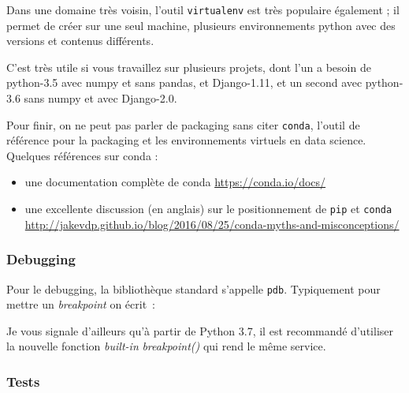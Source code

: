     Dans une domaine très voisin, l'outil \texttt{virtualenv} est très
populaire également ; il permet de créer sur une seul machine, plusieurs
environnements python avec des versions et contenus différents.

C'est très utile si vous travaillez sur plusieurs projets, dont l'un a
besoin de python-3.5 avec numpy et sans pandas, et Django-1.11, et un
second avec python-3.6 sans numpy et avec Django-2.0.

    Pour finir, on ne peut pas parler de packaging sans citer
\texttt{conda}, l'outil de référence pour la packaging et les
environnements virtuels en data science. Quelques références sur conda :

\begin{itemize}
\tightlist
\item
  une documentation complète de conda \url{https://conda.io/docs/}
\item
  une excellente discussion (en anglais) sur le positionnement de
  \texttt{pip} et \texttt{conda}
  \url{http://jakevdp.github.io/blog/2016/08/25/conda-myths-and-misconceptions/}
\end{itemize}

    \hypertarget{debugging}{%
\subsubsection{Debugging}\label{debugging}}

    Pour le debugging, la bibliothèque standard s'appelle \texttt{pdb}.
Typiquement pour mettre un \emph{breakpoint} on écrit~:

\begin{Shaded}
\begin{Highlighting}[]
\OperatorTok{=}\OperatorTok{**} 
    \OperatorTok{/} 
\end{Highlighting}
\end{Shaded}

    Je vous signale d'ailleurs qu'à partir de Python 3.7, il est recommandé
d'utiliser la nouvelle fonction \emph{built-in} \emph{breakpoint()} qui
rend le même service.

    \hypertarget{tests}{%
\subsubsection{Tests}\label{tests}}

